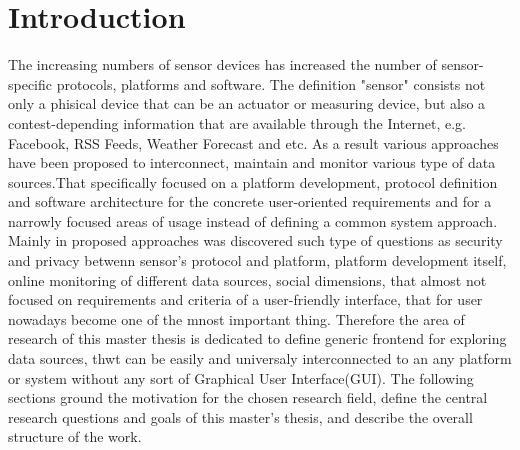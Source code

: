 
\chapter{Introduction}

  \begin{singlespace}
     The increasing numbers of sensor devices has increased the number of sensor-specific protocols, platforms and software.  The definition "sensor" consists not only a phisical device that can be an actuator or measuring device, but also a contest-depending information that are available through the Internet, e.g. Facebook, RSS Feeds, Weather Forecast and etc. As a result various approaches have been proposed to interconnect, maintain and monitor various type of data sources\cite{6588063,bendel2013service,song2010real}.That specifically focused on a platform development, protocol definition and software architecture for the concrete user-oriented requirements and for a narrowly focused areas of usage instead of defining a common system approach. Mainly in proposed approaches was discovered such type of questions as security and privacy betwenn sensor's protocol and platform, platform development itself, online monitoring of different data sources, social dimensions\cite{eggert2013sensorcloud}, that almost not focused on requirements and criteria of a user-friendly interface, that for user nowadays become one of the mnost important thing. Therefore the area of research of this master thesis is dedicated to define generic frontend for exploring data sources, thwt can be easily and universaly interconnected to an any platform or system without any sort of Graphical User Interface(GUI). The following sections ground the motivation for the chosen research field, define the central research questions and goals of this master's thesis, and describe the overall structure of the work.
  \end{singlespace}

